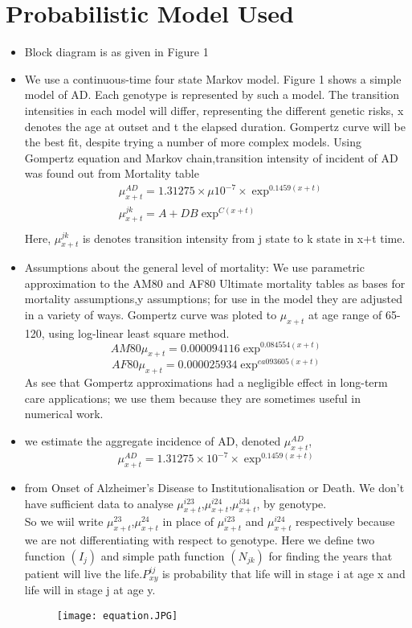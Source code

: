 \documentclass{article}
\begin{document}
\section {Probabilistic Model Used}
\begin{itemize}
\item Block diagram is as given in Figure 1
\item
We use a continuous-time four state Markov model. Figure 1 shows a simple model of AD. Each genotype is represented by
such a model. The transition intensities in each model will differ, representing the different genetic risks, x denotes the age at outset and t the elapsed duration. Gompertz curve will be
the best fit, despite trying a number of more complex models.
\newline
Using Gompertz equation and Markov chain,transition intensity of incident of AD was found out from Mortality table\\
\begin{align*}
&\mu_{x+t}^{AD}=1.31275\times \mu10^{-7}\times\exp^{0.1459(x+t)}\\  
&\mu_{x+t}^{jk}=A + DB\exp^{C(x+t)}\\
\end{align*}
Here, $\mu_{x+t}^{jk}$ is denotes transition intensity from j state to k state in x+t time.
\newline
\item Assumptions about the general level of mortality:
 We use parametric approximation to the AM80 and AF80 Ultimate mortality tables as bases for mortality assumptions,y assumptions; for use in the model they are adjusted in a variety of ways. Gompertz curve was ploted to $\mu_{x+t}$ at age range of 65-120, using log-linear least square method.
\[{AM80}\mu_{x+t} = 0.000094116\exp^{0.084554(x+t)}\]
\[{AF80}\mu_{x+t} = 0.000025934\exp^{ea093605(x+t)}\]
As see that Gompertz approximations had a negligible effect in long-term care applications; we use them because they are sometimes useful in numerical work.
\newline
\item we estimate the aggregate incidence of AD, denoted $\mu_{x+t}^{AD}$,
\[\mu_{x+t}^{AD}=1.31275\times 10^{-7}\times\exp^{0.1459(x+t)} \]
 \item from Onset of Alzheimer's Disease to Institutionalisation or Death.
 We don't have sufficient data to analyse $\mu_{x+t}^{i23}$,$\mu_{x+t}^{i24}$,$\mu_{x+t}^{i34}$, by genotype.
 \\ So we wiil write $\mu_{x+t}^{23}$,$\mu_{x+t}^{24}$ in place of $\mu_{x+t}^{i23}$ and $\mu_{x+t}^{i24}$ respectively because we are not differentiating with respect to genotype.
 Here we define two  function $(I_j)$ and simple path function $(N_{jk})$ for finding the years that patient will live the life.$P_{xy}^{ij}$ is probability that life will in stage i at age x and life will in stage j at age y. 
\begin{figure}[htp]
    \centering
    \texttt{[image: equation.JPG]}
    \label{fig:Plot}
\end{figure} 


\end{itemize}
\end{document}
